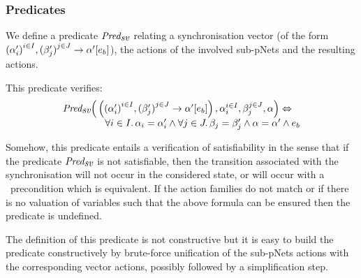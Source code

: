 \documentclass{lmcs}
\newtheorem{example}{Example}
\begin{document}

\subsubsection*{Predicates} 
 We 
define a
predicate $\Predsv$ relating a synchronisation vector (of the form ${(\alpha'_i)}^{i\in I}, {(\beta'_j)}^{j\in J}\to \alpha' [e_b]$),
the actions of the involved sub-pNets and the resulting actions.

 This predicate verifies:
\[\begin{array}{l}\Predsv \Big(\left(\SV{{(\alpha'_i)}^{i\in I}, {(\beta'_j)}^{j\in J}} 
{\alpha'} 
{e_b}\right), \alpha_i^{i\in I}, \beta_j^{j\in J}, \alpha\Big)\Leftrightarrow \\~\qquad\qquad%
%
\forall i\in I.\, \alpha_i=\alpha'_i\land \forall j \in J.\, \beta_j=\beta'_j \land 
\alpha=\alpha' 
\land e_b
\end{array} 
\]

Somehow, this predicate entails a verification of satisfiability in the sense that if the 
predicate $\Predsv$ is not satisfiable, then the transition associated with the 
synchronisation will not occur in the considered state, or will occur with a \False\ precondition which is equivalent.
If the action families do not match or if there is no valuation of
variables such that the above formula can be ensured then the predicate is undefined.

The definition of this predicate is not constructive but it is easy to build the predicate constructively by brute-force unification of the sub-pNets actions with the corresponding vector actions, possibly followed by a simplification step.
\end{document}

